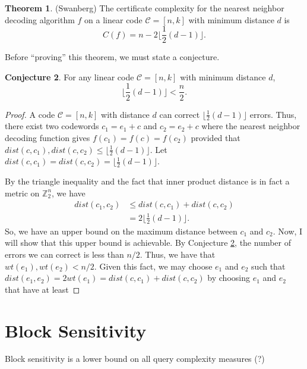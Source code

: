 \documentclass[12pt,twoside]{reedthesis}
\theoremstyle{definition}
\newtheorem{theorem}{Theorem}[chapter]
\newtheorem{conjecture}[theorem]{Conjecture}
\newcommand{\Z}{\mathbb{Z}}
\begin{document}
\begin{theorem}(Swanberg) The certificate complexity for the nearest neighbor decoding algorithm $f$ on a linear code  $\mathscr{C} = [n,k]$ with minimum distance $d$ is 
\begin{equation*}
 C(f) = n - 2\bigg\lfloor \frac{1}{2} (d-1) \bigg\rfloor.
 \end{equation*}
\end{theorem}

Before ``proving'' this theorem, we must state a conjecture.

\begin{conjecture}\label{hope_its_true}
For any linear code $\mathscr{C} = [n,k]$ with minimum distance $d$, 
\begin{equation*}
\bigg\lfloor \frac{1}{2}(d-1)\bigg\rfloor < \frac{n}{2}.
\end{equation*}
\end{conjecture}

\begin{proof}
A code $\mathscr{C}= [n,k]$ with distance $d$ can correct $\lfloor\frac{1}{2}(d-1)\rfloor$ errors. Thus, there exist two codewords $c_1 = e_1 + c$ and $c_2 = e_2 +c$ where the nearest neighbor decoding function gives $f(c_1) = f(c) = f(c_2)$ provided that $dist(c, c_1), dist(c, c_2) \leq \lfloor\frac{1}{2}(d-1)\rfloor$. Let $dist(c, c_1) = dist(c, c_2) = \lfloor\frac{1}{2}(d-1)\rfloor$.

By the triangle inequality and the fact that inner product distance is in fact a metric on $\Z_2^n$, we have 
\begin{align*}
dist(c_1, c_2) 
& \leq dist(c, c_1) + dist(c, c_2) \\
& = 2 \bigg\lfloor\frac{1}{2}(d-1)\bigg\rfloor.
\end{align*}
So, we have an upper bound on the maximum distance between $c_1$ and $c_2$. Now, I will show that this upper bound is achievable. By Conjecture \ref{hope_its_true}, the number of errors we can correct is less than $n/2$. Thus, we have that $wt(e_1), wt(e_2) < n/2$. Given this fact, we may choose $e_1$ and $e_2$ such that $dist(e_1, e_2) = 2 wt(e_1) = dist(c, c_1) + dist(c, c_2)$ by choosing $e_1$ and $e_2$ that have at least
\end{proof}


\section{Block Sensitivity}
Block sensitivity is a lower bound on all query complexity measures (?)
\end{document}
